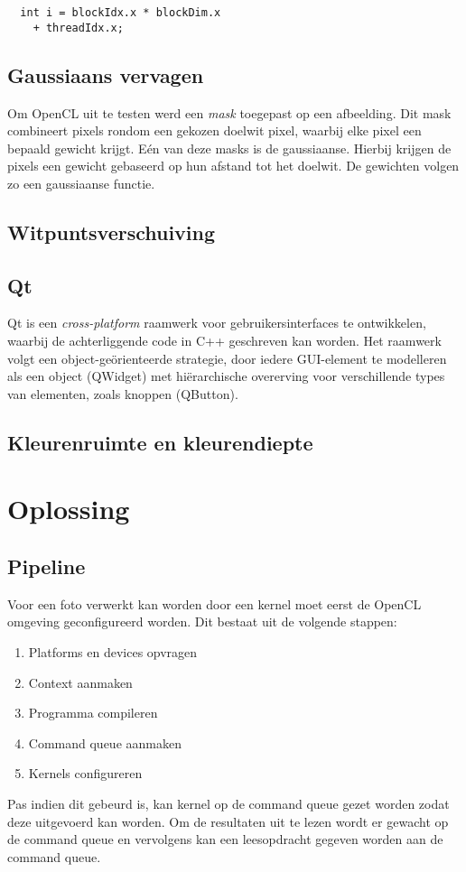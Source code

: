 \documentclass[twocolumn, a4paper]{article}
\begin{document}

\begin{verbatim}
  int i = blockIdx.x * blockDim.x 
    + threadIdx.x;
\end{verbatim}
\label{c:index}

\subsection{Gaussiaans vervagen}
Om OpenCL uit te testen werd een \textit{mask} toegepast op een afbeelding. Dit mask combineert pixels rondom een gekozen doelwit pixel, waarbij elke pixel een bepaald gewicht krijgt. E\'en van deze masks is de gaussiaanse. Hierbij krijgen de pixels een gewicht gebaseerd op hun afstand tot het doelwit. De gewichten volgen zo een gaussiaanse functie.

\subsection{Witpuntsverschuiving}

\subsection{Qt}
Qt is een \emph{cross-platform} raamwerk voor gebruikersinterfaces te ontwikkelen, waarbij de achterliggende code in C++ geschreven kan worden. Het raamwerk volgt een object-geörienteerde strategie, door iedere GUI-element te modelleren als een object (QWidget) met hiërarchische overerving voor verschillende types van elementen, zoals knoppen (QButton).

\subsection{Kleurenruimte en kleurendiepte}

\section{Oplossing}

\subsection{Pipeline}
Voor een foto verwerkt kan worden door een kernel moet eerst de OpenCL omgeving geconfigureerd worden. Dit bestaat uit de volgende stappen:

\begin{enumerate}
    \item Platforms en devices opvragen 
    \item Context aanmaken
    \item Programma compileren
    \item Command queue aanmaken
    \item Kernels configureren
\end{enumerate}
Pas indien dit gebeurd is, kan kernel op de command queue gezet worden zodat deze uitgevoerd kan worden. Om de resultaten uit te lezen wordt er gewacht op de command queue en vervolgens kan een leesopdracht gegeven worden aan de command queue. 
\end{document}
